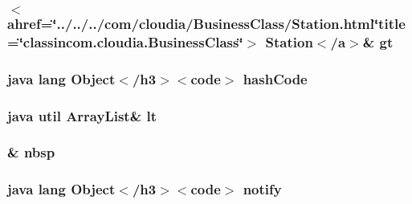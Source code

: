 \hypertarget{_stations_list_adapter_8html_a90aa0357a874ae1fde4b529e1b0f0e40}{
\subsubsection[{gt}]{\setlength{\rightskip}{0pt plus 5cm}$<$ahref=\char`\"{}../../../com/cloudia/Business\-Class/Station.\-html\char`\"{}title=\char`\"{}classincom.\-cloudia.\-Business\-Class\char`\"{}$>$ Station$<$/{\bf a}$>$\& gt}}\label{_stations_list_adapter_8html_a90aa0357a874ae1fde4b529e1b0f0e40}
\hypertarget{_stations_list_adapter_8html_a8e178e2bb2bef055ea23ea3910a221ca}{
\subsubsection[{hash\-Code}]{\setlength{\rightskip}{0pt plus 5cm}java lang Object$<$/h3$>$$<$code$>$ hash\-Code}}\label{_stations_list_adapter_8html_a8e178e2bb2bef055ea23ea3910a221ca}
\hypertarget{_stations_list_adapter_8html_a6046ea68583de5557b637104e82142fd}{
\subsubsection[{lt}]{\setlength{\rightskip}{0pt plus 5cm}java util Array\-List\& lt}}\label{_stations_list_adapter_8html_a6046ea68583de5557b637104e82142fd}
\hypertarget{_stations_list_adapter_8html_aef915316f784c9063d942974538301a6}{
\subsubsection[{nbsp}]{\setlength{\rightskip}{0pt plus 5cm}\& nbsp}}\label{_stations_list_adapter_8html_aef915316f784c9063d942974538301a6}
\hypertarget{_stations_list_adapter_8html_ae99ae10b5010594dbda4794e02db271b}{
\subsubsection[{notify}]{\setlength{\rightskip}{0pt plus 5cm}java lang Object$<$/h3$>$$<$code$>$ notify}}\label{_stations_list_adapter_8html_ae99ae10b5010594dbda4794e02db271b}
